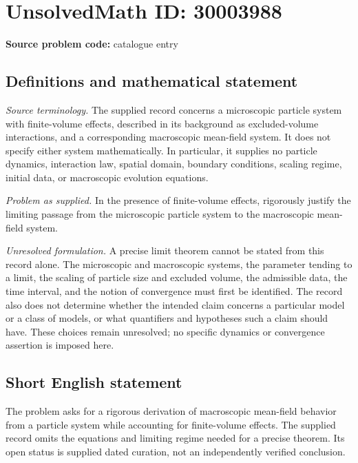 \documentclass[11pt]{article}
\begin{document}
\section*{UnsolvedMath ID: 30003988}
\textbf{Source problem code:} catalogue entry
\subsection{Definitions and mathematical statement}
\emph{Source terminology.} The supplied record concerns a microscopic particle system with finite-volume effects, described in its background as excluded-volume interactions, and a corresponding macroscopic mean-field system. It does not specify either system mathematically. In particular, it supplies no particle dynamics, interaction law, spatial domain, boundary conditions, scaling regime, initial data, or macroscopic evolution equations.

\emph{Problem as supplied.} In the presence of finite-volume effects, rigorously justify the limiting passage from the microscopic particle system to the macroscopic mean-field system.

\emph{Unresolved formulation.} A precise limit theorem cannot be stated from this record alone. The microscopic and macroscopic systems, the parameter tending to a limit, the scaling of particle size and excluded volume, the admissible data, the time interval, and the notion of convergence must first be identified. The record also does not determine whether the intended claim concerns a particular model or a class of models, or what quantifiers and hypotheses such a claim should have. These choices remain unresolved; no specific dynamics or convergence assertion is imposed here.
\subsection{Short English statement}
The problem asks for a rigorous derivation of macroscopic mean-field behavior from a particle system while accounting for finite-volume effects. The supplied record omits the equations and limiting regime needed for a precise theorem. Its open status is supplied dated curation, not an independently verified conclusion.
\end{document}
